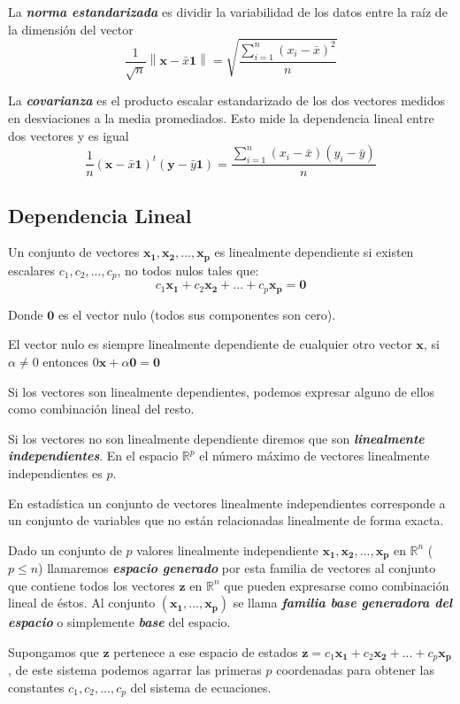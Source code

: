 \documentclass[12pt,letterpaper]{report} %
\begin{document}
La \textit{\textbf{norma estandarizada}} es dividir la variabilidad de los datos entre la raíz de la dimensión del vector
$$\frac{1}{\sqrt{n}}\left\| \mathbf{x}-\bar x\mathbf{1} \right\|= \sqrt{\frac{\sum_{i=1}^n (x_i-\bar x)^2}{n}}$$ 

La \textit{\textbf{covarianza}} es el producto escalar estandarizado de los dos vectores medidos en desviaciones a la media promediados. Esto mide la dependencia lineal entre dos vectores y es igual
$$\frac{1}{n}(\mathbf{x}-\bar x\mathbf{1})^t(\mathbf{y}-\bar y\mathbf{1})=\frac{\sum_{i=1}^n (x_i-\bar x)(y_i - \bar y)}{n}$$

\subsection{Dependencia Lineal}

Un conjunto de vectores $\mathbf{x_1},\mathbf{x_2},...,\mathbf{x_p}$ es linealmente dependiente si existen escalares $c_1,c_2,...,c_p$, no todos nulos tales que:
$$c_1\mathbf{x_1}+c_2\mathbf{x_2}+...+c_p\mathbf{x_p}=\mathbf{0}$$

Donde $\mathbf{0}$ es el vector nulo (todos sus componentes son cero).

El vector nulo es siempre linealmente dependiente de cualquier otro vector $\mathbf{x}$, si $\alpha\ne 0$ entonces $0\mathbf{x}+\alpha\mathbf{0}=\mathbf{0}$

Si los vectores son linealmente dependientes, podemos expresar alguno de ellos como combinación lineal del resto.

Si los vectores no son linealmente dependiente diremos que son \textit{\textbf{linealmente independientes}}. En el espacio $\mathbb{R}^p$ el número máximo de vectores linealmente
independientes es $p$.

En estadística un conjunto de vectores linealmente independientes corresponde a un conjunto de variables que no están relacionadas linealmente de forma exacta.

Dado un conjunto de $p$ valores linealmente independiente $\mathbf{x_1},\mathbf{x_2},...,\mathbf{x_p}$ en $\mathbb{R}^n$ ($p\le n$) llamaremos \textit{\textbf{espacio generado}} por esta familia de vectores al conjunto que contiene todos los vectores $\mathbf{z}$ en $\mathbb{R}^n$ que pueden expresarse como combinación lineal de éstos. Al conjunto $(\mathbf{x_1},...,\mathbf{x_p})$ se llama \textit{\textbf{familia base generadora del espacio}} o simplemente \textit{\textbf{base}} del espacio.

Supongamos que $\mathbf{z}$ pertenece a ese espacio de estados $\mathbf{z}=c_1\mathbf{x_1}+c_2\mathbf{x_2}+...+c_p\mathbf{x_p}$, de este sistema podemos agarrar las primeras $p$ coordenadas para obtener las constantes $c_1,c_2,...,c_p$ del sistema de ecuaciones.
\end{document}
